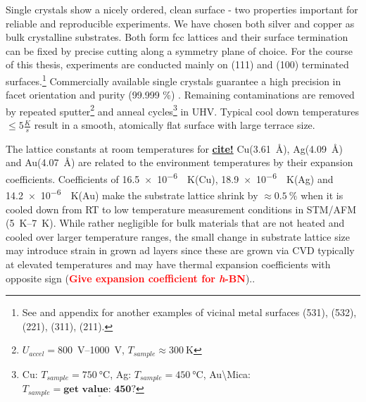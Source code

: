 Single crystals show a nicely ordered, clean surface - two properties important for reliable and reproducible experiments. We have chosen both silver and copper as bulk crystalline substrates. Both form fcc lattices and their surface termination can be fixed by precise cutting along a symmetry plane of choice. For the course of this thesis, experiments are conducted mainly on (111) and (100) terminated surfaces.\footnote{See \cite{riemann_ionic_2002} and appendix  for another examples of vicinal metal surfaces (531), (532), (221), (311), (211).} Commercially available single crystals guarantee a high precision in facet orientation and purity (99.999 \%) \cite{mateck}. 
Remaining contaminations 
are removed by repeated sputter\footnote{$U_{accel}=$\SIrange{800}{1000}{\volt}, $T_{sample}\approx \SI{300}{\kelvin}$} and anneal cycles\footnote{Cu: $T_{sample}=\SI{750}{\celsius}$, Ag: $T_{sample}=\SI{450}{\celsius}$, Au\textbackslash Mica: $T_{sample}= \underline{\textbf{get value: 450?}}$} in UHV. Typical cool down temperatures $\leq 5 \frac{K}{s}$ result in a smooth, atomically flat surface with large terrace size. 

The lattice constants at room temperatures for \underline{\textbf{cite!}} Cu(\SI{3,61}{\angstrom}), Ag(\SI{4,09}{\angstrom}) and Au(\SI{4,07}{\angstrom}) are related to the environment temperatures by their expansion coefficients.
Coefficients of \SI{16,5e-6}{\per \kelvin}(Cu), \SI{18,9e-6}{\per \kelvin}(Ag) and \SI{14,2e-6}{\per \kelvin}(Au) make the substrate lattice shrink by $\approx \SI{0,5}{\percent}$ when it is cooled down from RT to low temperature measurement conditions in STM/AFM (\SIrange{5}{7}{\kelvin}). While rather negligible for bulk materials that are not heated and cooled over larger temperature ranges, the small change in substrate lattice size may introduce strain in grown ad layers since these are grown via CVD typically at elevated temperatures and may have thermal expansion coefficients with opposite sign (\textcolor{red}{\textbf{Give expansion coefficient for \textit{h}-BN}}).\cite{farwick_zum_hagen_structure_2016}.

